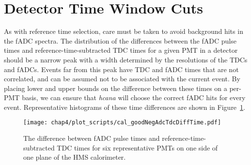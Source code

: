 \section{Detector Time Window Cuts}
As with reference time selection, care must be taken to avoid background hits
in the fADC spectra.
The distribution of the differences between the fADC pulse times and
reference-time-subtracted TDC times for a given PMT in a detector should
be a narrow peak with a width determined by the resolutions of the TDCs
and fADCs.
Events far from this peak have TDC and fADC times that are not correlated, and
can be assumed not to be associated with the current event.
By placing lower and upper bounds on the difference between these times on a
per-PMT basis, we can ensure that \textit{hcana} will choose the correct fADC
hits for every event.
Representative histograms of these time differences are shown in
Figure~\ref{fig:cal_goodNegAdcTdcDiffTime}.


\begin{figure}[!h]
    \centering
    \texttt{[image: chap4/plot\_scripts/cal\_goodNegAdcTdcDiffTime.pdf]}
    \caption{
            The difference between fADC pulse times and
            reference-time-subtracted TDC times for six representative PMTs
            on one side of one plane of the HMS calorimeter.
            }
    \label{fig:cal_goodNegAdcTdcDiffTime}
\end{figure}
